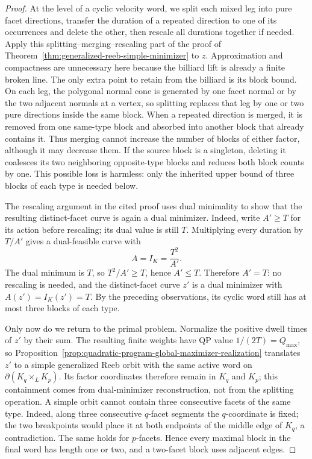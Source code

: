 \begin{proof}
At the level of a cyclic velocity word, we split each mixed leg into pure
facet directions, transfer the duration of a repeated direction to one of its
occurrences and delete the other, then rescale all durations together if needed.
Apply this splitting--merging--rescaling part of the proof of
Theorem~\ref{thm:generalized-reeb-simple-minimizer} to \(z\). Approximation and
compactness are unnecessary here because the billiard lift is already a finite
broken line. The only extra point to retain from the billiard is its block
bound. On each leg, the polygonal normal cone is generated by one facet normal
or by the two adjacent normals at a vertex, so splitting replaces that leg by
one or two pure directions inside the same block. When a repeated direction is
merged, it is removed from one same-type block and absorbed into another block
that already contains it.  Thus merging cannot increase the number of blocks
of either factor, although it may decrease them.  If the source block is a
singleton, deleting it coalesces its two neighboring opposite-type blocks and
reduces both block counts by one.  This possible loss is harmless: only the
inherited upper bound of three blocks of each type is needed below.

The rescaling argument in the cited proof uses dual minimality to show that the
resulting distinct-facet curve is again a dual minimizer. Indeed, write
\(A'\geq T\) for its action before rescaling; its dual value is still \(T\).
Multiplying every duration by \(T/A'\) gives a dual-feasible curve with
\[
  A=I_K=\frac{T^2}{A'}.
\]
The dual minimum is \(T\), so \(T^2/A'\geq T\), hence \(A'\leq T\). Therefore
\(A'=T\): no rescaling is needed, and the distinct-facet curve \(z'\) is a
dual minimizer with \(A(z')=I_K(z')=T\). By the preceding observations, its
cyclic word still has at most three blocks of each type.

Only now do we return to the primal problem.  Normalize the positive dwell
times of \(z'\) by their sum. The resulting finite weights have QP value
\(1/(2T)=Q_{\max}\), so
Proposition~\ref{prop:quadratic-program-global-maximizer-realization} translates
\(z'\) to a simple generalized Reeb orbit with the same active word on
\(\partial(K_q\times_L K_p)\).  Its factor coordinates therefore remain in
\(K_q\) and \(K_p\); this containment comes from dual-minimizer reconstruction,
not from the splitting operation. A simple orbit cannot contain three
consecutive facets of the same type. Indeed, along
three consecutive \(q\)-facet segments the \(q\)-coordinate is fixed; the two
breakpoints would place it at both endpoints of the middle edge of \(K_q\), a
contradiction. The same holds for \(p\)-facets. Hence every maximal block in
the final word has length one or two, and a two-facet block uses adjacent
edges.


\end{proof}
